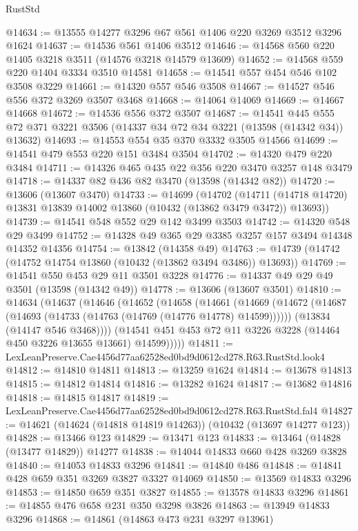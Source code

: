 \begin{lexlean}{RustStd}
\begin{coremodule}
@14634 := @13555 @14277 @3296 @67 @561 @1406 @220 @3269 @3512 @3296 @1624
@14637 := @14536 @561 @1406 @3512
@14646 := @14568 @560 @220 @1405 @3218 @3511 (@14576 @3218 @14579 @13609)
@14652 := @14568 @559 @220 @1404 @3334 @3510 @14581
@14658 := @14541 @557 @454 @546 @102 @3508 @3229
@14661 := @14320 @557 @546 @3508
@14667 := @14527 @546 @556 @372 @3269 @3507 @3468
@14668 := @14064 @14069
@14669 := @14667 @14668
@14672 := @14536 @556 @372 @3507
@14687 := @14541
    @445
    @555
    @72
    @371
    @3221
    @3506
    (@14337 @34 @72 @34 @3221 (@13598 (@14342 @34)) @13632)
@14693 := @14553 @554 @35 @370 @3332 @3505 @14566
@14699 := @14541 @479 @553 @220 @151 @3484 @3504
@14702 := @14320 @479 @220 @3484
@14711 := @14326 @465 @435 @22 @356 @220 @3470 @3257 @148 @3479
@14718 := @14337 @82 @436 @82 @3470 (@13598 (@14342 @82))
@14720 := @13606 (@13607 @3470)
@14733 := @14699
    (@14702
      (@14711 (@14718 @14720) @13831 @13839 @14002 @13860 (@10432 (@13862 @3479 @3472)) @13693))
@14739 := @14541 @548 @552 @29 @142 @3499 @3503
@14742 := @14320 @548 @29 @3499
@14752 := @14328 @49 @365 @29 @3385 @3257 @157 @3494 @14348 @14352 @14356
@14754 := @13842 (@14358 @49)
@14763 := @14739 (@14742 (@14752 @14754 @13860 (@10432 (@13862 @3494 @3486)) @13693))
@14769 := @14541 @550 @453 @29 @11 @3501 @3228
@14776 := @14337 @49 @29 @49 @3501 (@13598 (@14342 @49))
@14778 := @13606 (@13607 @3501)
@14810 := @14634
    (@14637
      (@14646
        (@14652
          (@14658
            (@14661
              (@14669
                (@14672 (@14687 (@14693 (@14733 (@14763 (@14769 (@14776 @14778) @14599))))))
                (@13834 (@14147 @546 @3468))))
            (@14541 @451 @453 @72 @11 @3226 @3228 (@14464 @450 @3226 @13655 @13661) @14599)))))
@14811 := LexLeanPreserve.Cae4456d77aa62528ed0bd9d0612cd278.R63.RustStd.look4
@14812 := @14810 @14811
@14813 := @13259 @1624
@14814 := @13678 @14813
@14815 := @14812 @14814
@14816 := @13282 @1624
@14817 := @13682 @14816
@14818 := @14815 @14817
@14819 := LexLeanPreserve.Cae4456d77aa62528ed0bd9d0612cd278.R63.RustStd.fal4
@14827 := @14621 (@14624 (@14818 @14819 @14263)) (@10432 (@13697 @14277 @123))
@14828 := @13466 @123
@14829 := @13471 @123
@14833 := @13464 (@14828 (@13477 @14829)) @14277
@14838 := @14044 @14833 @660 @428 @3269 @3828
@14840 := @14053 @14833 @3296
@14841 := @14840 @486
@14848 := @14841 @428 @659 @351 @3269 @3827 @3327 @14069
@14850 := @13569 @14833 @3296
@14853 := @14850 @659 @351 @3827
@14855 := @13578 @14833 @3296
@14861 := @14855 @476 @658 @231 @350 @3298 @3826
@14863 := @13949 @14833 @3296
@14868 := @14861 (@14863 @473 @231 @3297 @13961)

\end{coremodule}
\end{lexlean}
